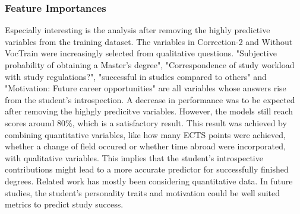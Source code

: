 \subsubsection{Feature Importances}
Especially interesting is the analysis after removing the highly predictive variables from the training dataset. The variables in Correction-2 and Without VocTrain were increasingly selected from qualitative questions. "Subjective probability of obtaining a Master's degree", "Correspondence of study workload with study regulations?", "successful in studies compared to others" and "Motivation: Future career opportunities" are all variables whose answers rise from the student's introspection. A decrease in performance was to be expected after removing the highgly predicitve variables. However, the models still reach scores around 80\%, which is a satisfactory result. This result was achieved by combining quantitative variables, like how many ECTS points were achieved, whether a change of field occured or whether time abroad were incorporated, with qualitative variables. This implies that the student's introspective contributions might lead to a more accurate predictor for successfully finished degrees. Related work has mostly been considering quantitative data. In future studies, the student's personality traits and motivation could be well suited metrics to predict study success.

